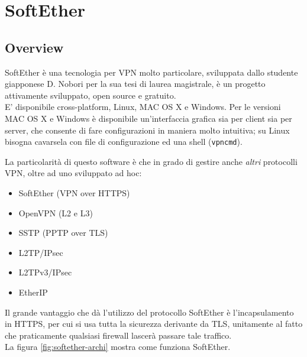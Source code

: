 \section{SoftEther}
\subsection{Overview}
SoftEther \cite{softether} è una tecnologia per VPN molto particolare, sviluppata dallo studente
giapponese D. Nobori per la sua tesi di laurea magistrale,
è un progetto
attivamente sviluppato, open source e gratuito.\\
E' disponibile cross-platform, Linux, MAC OS X e Windows. Per
le versioni MAC OS X e Windows è disponibile un'interfaccia grafica sia per client
sia per server, che consente di fare configurazioni in maniera molto intuitiva; su Linux
bisogna cavarsela con file di configurazione ed una shell (\texttt{vpncmd}).


La particolarità di questo software è che in grado di gestire anche \textit{altri}
protocolli VPN, oltre ad uno sviluppato ad hoc:
\begin{itemize}
  \item SoftEther (VPN over HTTPS)
  \item OpenVPN (L2  e L3)
  \item SSTP (PPTP over TLS)
  \item L2TP/IPsec
  \item L2TPv3/IPsec
  \item EtherIP
\end{itemize}
Il grande vantaggio che dà l'utilizzo del protocollo SoftEther è l'incapsulamento in
HTTPS, per cui si usa tutta la sicurezza derivante da TLS, unitamente al fatto che
praticamente qualsiasi firewall lascerà passare tale traffico.\\
La figura \ref{fig:softether-archi} mostra come funziona SoftEther.


